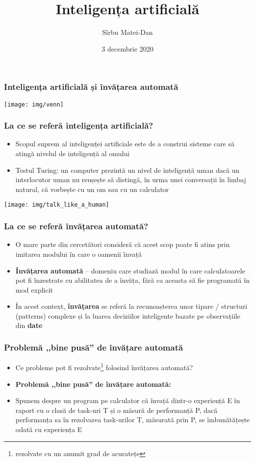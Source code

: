 \documentclass{beamer}
\title{\bf Inteligența artificială}
\author[matei.sirbu@student.unitbv.ro]{Sîrbu Matei-Dan}
\institute[UniTBv]{Universitatea Transilvania din Brașov \\ Facultatea de Matematică și Informatică}
\date{3 decembrie 2020}
\newcommand*{\utb}{\item[{\texttt{[image: img/UTSymbols-Bullet.png]}}]}
\begin{document}
\frame{\titlepage}

\begin{frame}
    \frametitle{Inteligența artificială și învățarea automată}
    \texttt{[image: img/venn]}
\end{frame}

\begin{frame}
    \frametitle{La ce se referă inteligența artificială?}
    \begin{itemize}
        \utb Scopul suprem al inteligenței artificiale este de a construi sisteme care să atingă nivelul de inteligență al omului
        \utb Testul Turing: un computer prezintă un nivel de inteligență uman dacă un interlocutor uman nu reușește să distingă, în urma unei conversații în limbaj natural, că vorbește cu un om sau cu un calculator
    \end{itemize}
    \begin{center}
        \texttt{[image: img/talk\_like\_a\_human]}
    \end{center}
\end{frame}

\begin{frame}
    \frametitle{La ce se referă învățarea automată?}
    \begin{itemize}
        \utb O mare parte din cercetători consideră că acest scop poate fi atins prin imitarea modului în care o oamenii învață
        \utb \textbf{Învățarea automată} – domeniu care studiază modul în care calculatoarele pot fi înzestrate cu abilitatea de a învăța, fără ca aceasta să fie programată în mod explicit
        \utb În acest context, \textbf{învățarea} se referă la recunoașterea unor tipare / structuri (patterns) complexe și la luarea deciziilor inteligente bazate pe observațiile din \textbf{date}
    \end{itemize}
\end{frame}

\begin{frame}
    \frametitle{Problemă ,,bine pusă'' de învățare automată}
    \begin{itemize}
        \utb Ce probleme pot fi rezolvate\footnote[frame]{rezolvate cu un anumit grad de acuratețe} folosind învățarea automată?
        \utb \textbf{Problemă ,,bine pusă'' de învățare automată:}
        \utb Spunem despre un program pe calculator că învață dintr-o experiență E în raport cu o clasă de task-uri T și o măsură de performanță P, dacă performanța sa în rezolvarea task-urilor T, măsurată prin P, se îmbunătățește odată cu experiența E
    \end{itemize}
\end{frame}
\end{document}
